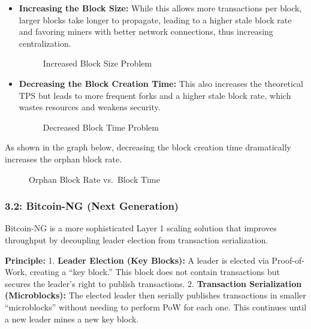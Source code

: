 \begin{itemize}
\item
  \textbf{Increasing the Block Size:} While this allows more
  transactions per block, larger blocks take longer to propagate,
  leading to a higher stale block rate and favoring miners with better
  network connections, thus increasing centralization.

  \begin{figure}
  \centering
  \caption{Increased Block Size Problem}
  \end{figure}
\item
  \textbf{Decreasing the Block Creation Time:} This also increases the
  theoretical TPS but leads to more frequent forks and a higher stale
  block rate, which wastes resources and weakens security.

  \begin{figure}
  \centering
  \caption{Decreased Block Time Problem}
  \end{figure}
\end{itemize}

As shown in the graph below, decreasing the block creation time
dramatically increases the orphan block rate.

\begin{figure}
\centering
\caption{Orphan Block Rate vs.~Block Time}
\end{figure}

\subsubsection{3.2: Bitcoin-NG (Next
Generation)}\label{bitcoin-ng-next-generation}

Bitcoin-NG is a more sophisticated Layer 1 scaling solution that
improves throughput by decoupling leader election from transaction
serialization.

\textbf{Principle:} 1. \textbf{Leader Election (Key Blocks):} A leader
is elected via Proof-of-Work, creating a ``key block.'' This block does
not contain transactions but secures the leader's right to publish
transactions. 2. \textbf{Transaction Serialization (Microblocks):} The
elected leader then serially publishes transactions in smaller
``microblocks'' without needing to perform PoW for each one. This
continues until a new leader mines a new key block.

